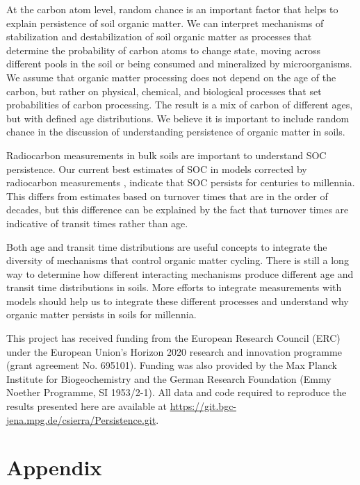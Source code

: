 \documentclass[draft,linenumbers]{agujournal}
\begin{document}
At the carbon atom level, random chance is an important factor that helps to explain persistence of soil organic matter. We can interpret mechanisms of stabilization and destabilization of soil organic matter as processes that determine the probability of carbon atoms to change state, moving across different pools in the soil or being consumed and mineralized by microorganisms. We assume that organic matter processing does not depend on the age of the carbon, but rather on physical, chemical, and biological processes that set probabilities of carbon processing. The result is a mix of carbon of different ages, but with defined age distributions. We believe it is important to include random chance in the discussion of understanding persistence of organic matter in soils. 

Radiocarbon measurements in bulk soils are important to understand SOC persistence. Our current best estimates of SOC in models corrected by radiocarbon measurements \citep{He2016}, indicate that SOC persists for centuries to millennia. This differs from estimates based on turnover times that are in the order of decades, but this difference can be explained by the fact that turnover times are indicative of transit times rather than age. 

Both age and transit time distributions are useful concepts to integrate the diversity of mechanisms that control organic matter cycling. There is still a long way to determine how different interacting mechanisms produce different age and transit time distributions in soils. More efforts to integrate measurements with models should help us to integrate these different processes and understand why organic matter persists in soils for millennia. 


\acknowledgments
This project has received funding from the European Research Council (ERC) under the European Union's Horizon 2020 research and innovation programme (grant agreement No.   695101). Funding was also provided by the Max Planck Institute for Biogeochemistry and the German Research Foundation (Emmy Noether Programme, SI 1953/2-1). All data and code required to reproduce the results presented here are available at \url{https://git.bgc-jena.mpg.de/csierra/Persistence.git}.




\clearpage

\section*{Appendix}
\end{document}
